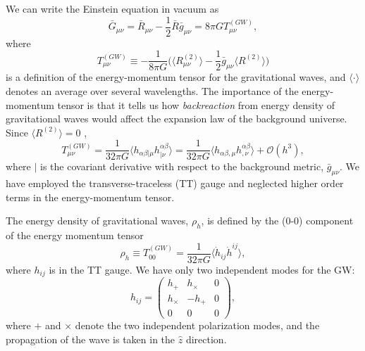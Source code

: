 \documentclass[11pt,a4paper,twoside]{book}
\begin{document}
We can write the Einstein equation in vacuum as
\begin{equation}
\label{Chap3:RGEquation}
\bar{G}_{\mu\nu} = \bar{R}_{\mu\nu} - \frac{1}{2}\bar{R}\bar{g}_{\mu\nu} = 8\pi G T_{\mu\nu}^{(GW)},
\end{equation}
where
\begin{equation}
	\label{Chap3:TGWEquation}
	T_{\mu\nu}^{(GW)} \equiv -\frac{1}{8\pi G}\Big (\langle R^{(2)}_{\mu\nu}\rangle  - \frac{1}{2}\bar{g}_{\mu\nu}\langle R^{(2)}\rangle \Big)
\end{equation}
is a definition of the energy-momentum tensor for the gravitational waves, and $ \langle\cdot\rangle $ denotes an average over several wavelengths. The importance of the energy-momentum tensor is that it tells us how \textit{backreaction} from energy density of gravitational waves would affect the expansion law of the background universe. Since $ \langle R^{(2)}\rangle = 0 $ \cite{Chap3: Gravitation},
\begin{equation}
	\label{Chap3:TGW2}
	T_{\mu\nu}^{(GW)} = \frac{1}{32\pi G}\langle h_{\alpha\beta|\mu}h^{\alpha\beta}_{|\nu} \rangle  = \frac{1}{32\pi G} \langle h_{\alpha\beta,\mu} h^{\alpha\beta}_{,\nu} \rangle
	 + \mathcal{O}(h^{3}),
\end{equation}
where $ | $ is the covariant derivative with respect to the background metric, $\bar{g}_{\mu\nu} $. We have employed the transverse-traceless (TT) gauge and neglected higher order terms in the energy-momentum tensor.

The energy density of gravitational waves, $ \rho_{h} $, is defined by the (0-0) component of the energy momentum tensor
\begin{equation}
	\label{Chap3:energydensity}
	\rho_{h} \equiv T_{00}^{(GW)} = \frac{1}{32\pi G} \langle\dot{h}_{ij}\dot{h}^{ij}\rangle  ,
\end{equation}
where $ h_{ij} $ is in the TT gauge. We have only two independent modes for the GW:
\begin{equation}
	\label{Chap3:GWMatrix}
	h_{ij} = \left(
	\begin{array}{ccc}
		h_{+} & h_{\times} & 0 \\
		h_{\times} &- h_{+} & 0 \\
		0 & 0 & 0
	\end{array}
	\right),
\end{equation}
where $ + $ and $ \times $ denote the two independent polarization modes, and the propagation of the wave is taken in the $ \hat{z} $ direction.
\end{document}
